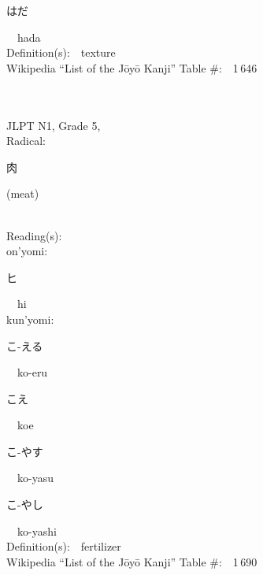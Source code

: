 \begin{multicols}{2}
{\hspace*{2em}}{\begin{CJK}{UTF8}{min} はだ \end{CJK}}\ \ hada\ \ \\
Definition(s):\ \ texture \\
Wikipedia ``List of the J\=oy\=o Kanji'' Table \#:\ \ 1\,646 \\
\ \ \\
{\fontsize{34pt}{40pt}  }\ \ \\  %
{JLPT N1, Grade 5, \\Radical:\ \ {\begin{CJK}{UTF8}{min} 肉 \end{CJK}} (meat) } \\
Reading(s):\ \ \\
{\hspace*{1em}}on'yomi:\ \ \\
{\hspace*{2em}}{\begin{CJK}{UTF8}{min} ヒ \end{CJK}}\ \ hi\ \ \\
{\hspace*{1em}}kun'yomi:\ \ \\
{\hspace*{2em}}{\begin{CJK}{UTF8}{min} こ-える \end{CJK}}\ \ ko-eru\ \ \\
{\hspace*{2em}}{\begin{CJK}{UTF8}{min} こえ \end{CJK}}\ \ koe\ \ \\
{\hspace*{2em}}{\begin{CJK}{UTF8}{min} こ-やす \end{CJK}}\ \ ko-yasu\ \ \\
{\hspace*{2em}}{\begin{CJK}{UTF8}{min} こ-やし \end{CJK}}\ \ ko-yashi\ \ \\
Definition(s):\ \ fertilizer \\
Wikipedia ``List of the J\=oy\=o Kanji'' Table \#:\ \ 1\,690 \\
\ \ \\

\end{multicols}
